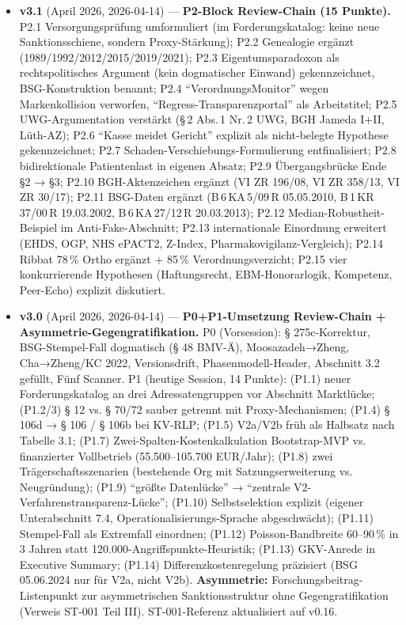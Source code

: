 \documentclass{umbruch-position}
\begin{document}
{\small\sloppy
\begin{itemize}[leftmargin=3em, itemsep=0.5em]
  \item \textbf{v3.1} (April 2026, 2026-04-14) --- \textbf{P2-Block Review-Chain (15 Punkte).} P2.1 Versorgungsprüfung umformuliert (im Forderungskatalog: keine neue Sanktionsschiene, sondern Proxy-Stärkung); P2.2 Genealogie ergänzt (1989/1992/2012/2015/2019/2021); P2.3 Eigentumsparadoxon als rechtspolitisches Argument (kein dogmatischer Einwand) gekennzeichnet, BSG-Konstruktion benannt; P2.4 ``VerordnungsMonitor'' wegen Markenkollision verworfen, ``Regress-Transparenzportal'' als Arbeitstitel; P2.5 UWG-Argumentation verstärkt (\S\,2 Abs.\,1 Nr.\,2 UWG, BGH Jameda I+II, Lüth-AZ); P2.6 ``Kasse meidet Gericht'' explizit als nicht-belegte Hypothese gekennzeichnet; P2.7 Schaden-Verschiebungs-Formulierung entfinalisiert; P2.8 bidirektionale Patientenlast in eigenen Absatz; P2.9 Übergangsbrücke Ende §2 → §3; P2.10 BGH-Aktenzeichen ergänzt (VI ZR 196/08, VI ZR 358/13, VI ZR 30/17); P2.11 BSG-Daten ergänzt (B\,6\,KA\,5/09\,R 05.05.2010, B\,1\,KR\,37/00\,R 19.03.2002, B\,6\,KA\,27/12\,R 20.03.2013); P2.12 Median-Robustheit-Beispiel im Anti-Fake-Abschnitt; P2.13 internationale Einordnung erweitert (EHDS, OGP, NHS ePACT2, Z-Index, Pharmakovigilanz-Vergleich); P2.14 Ribbat 78\,\% Ortho ergänzt + 85\,\% Verordnungsverzicht; P2.15 vier konkurrierende Hypothesen (Haftungsrecht, EBM-Honorarlogik, Kompetenz, Peer-Echo) explizit diskutiert.

  \item \textbf{v3.0} (April 2026, 2026-04-14) --- \textbf{P0+P1-Umsetzung Review-Chain + Asymmetrie-Gegengratifikation.} P0 (Vorsession): § 275c-Korrektur, BSG-Stempel-Fall dogmatisch (§ 48 BMV-Ä), Moosazadeh→Zheng, Cha→Zheng/KC 2022, Versionsdrift, Phasenmodell-Header, Abschnitt 3.2 gefüllt, Fünf Scanner. P1 (heutige Session, 14 Punkte): (P1.1) neuer Forderungskatalog an drei Adressatengruppen vor Abschnitt Marktlücke; (P1.2/3) § 12 vs. § 70/72 sauber getrennt mit Proxy-Mechanismen; (P1.4) § 106d → § 106 / § 106b bei KV-RLP; (P1.5) V2a/V2b früh als Halbsatz nach Tabelle 3.1; (P1.7) Zwei-Spalten-Kostenkalkulation Bootstrap-MVP vs. finanzierter Vollbetrieb (55.500--105.700 EUR/Jahr); (P1.8) zwei Trägerschaftsszenarien (bestehende Org mit Satzungserweiterung vs. Neugründung); (P1.9) ``größte Datenlücke'' → ``zentrale V2-Verfahrenstransparenz-Lücke''; (P1.10) Selbstselektion explizit (eigener Unterabschnitt 7.4, Operationalisierungs-Sprache abgeschwächt); (P1.11) Stempel-Fall als Extremfall einordnen; (P1.12) Poisson-Bandbreite 60--90\,\% in 3 Jahren statt 120.000-Angriffspunkte-Heuristik; (P1.13) GKV-Anrede in Executive Summary; (P1.14) Differenzkostenregelung präzisiert (BSG 05.06.2024 nur für V2a, nicht V2b). \textbf{Asymmetrie:} Forschungsbeitrag-Listenpunkt zur asymmetrischen Sanktionsstruktur ohne Gegengratifikation (Verweis ST-001 Teil III). ST-001-Referenz aktualisiert auf v0.16.


\end{itemize}}
\end{document}
